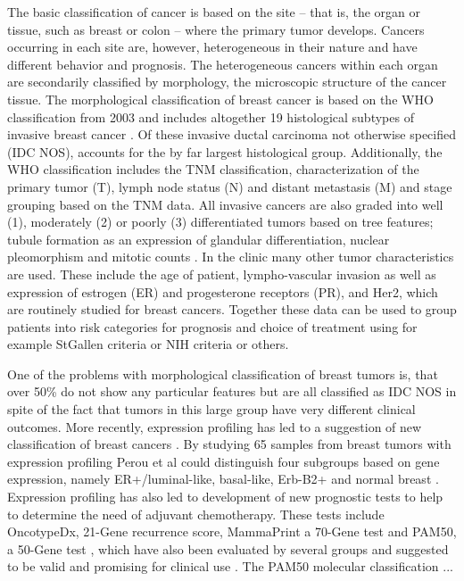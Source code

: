 The basic classification of cancer is based on the site -- that is, the organ or
tissue, such as breast or colon -- where the primary tumor develops. Cancers
occurring in each site are, however, heterogeneous in their nature and have
different behavior and prognosis. The heterogeneous cancers
within each organ are secondarily classified by morphology, the microscopic structure of
the cancer tissue. The morphological classification of breast cancer is based
on the WHO classification from 2003 and includes altogether 19 histological
subtypes of invasive breast cancer \citep{T8,T9}. Of these invasive ductal carcinoma
not otherwise specified (IDC NOS), accounts for the by far largest
histological group.  Additionally, the WHO classification includes the TNM
classification, characterization of the primary tumor (T), lymph node status
(N) and distant metastasis (M) and stage grouping based on the TNM data. All
invasive cancers are also graded into well (1), moderately (2) or poorly (3)
differentiated tumors based on  tree features; tubule formation as an
expression of glandular differentiation, nuclear pleomorphism and mitotic
counts \citep{T8}.  In the clinic many other tumor characteristics are used.  These
include the age of patient, lympho-vascular invasion as well as expression of
estrogen (ER) and progesterone receptors (PR), and Her2, which are routinely
studied for breast cancers. Together these data can be used to group patients
into risk categories for prognosis and choice of treatment using for example
StGallen criteria \citep{T11} or NIH criteria \citep{T12} or others.

One of the problems with morphological classification of breast tumors is,
that over 50\% do not show any particular features but are all classified as
IDC NOS in spite of the fact that tumors in this large group have very
different clinical outcomes. More recently, expression profiling has led to a
suggestion of new classification of breast cancers \citep{T13, T14}. By studying 65
samples from breast tumors with expression profiling Perou et al could
distinguish four subgroups based on gene expression, namely ER+/luminal-like,
basal-like, Erb-B2+ and normal breast \citep{T13}. Expression profiling has also led
to development of new prognostic tests to help to determine the need of
adjuvant chemotherapy.  These tests include OncotypeDx, 21-Gene recurrence
score, MammaPrint a 70-Gene test and PAM50, a 50-Gene test , which have also
been evaluated by several groups and suggested to be valid and promising for
clinical use \citep{T15}. The PAM50 molecular classification ...

